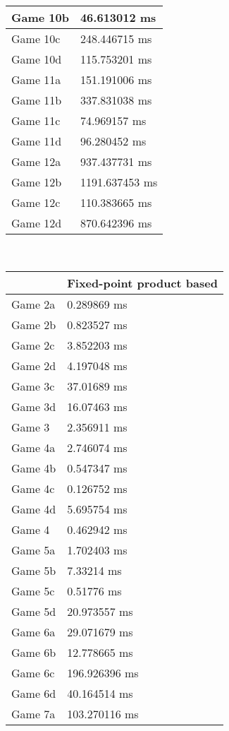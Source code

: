 \begin{multicols}{2}
\begin{tabular}{|l|l|}
	Game 10b & 46.613012 ms \\ \hline
	Game 10c & 248.446715 ms \\ \hline
	Game 10d & 115.753201 ms \\ \hline
	Game 11a & 151.191006 ms \\ \hline
	Game 11b & 337.831038 ms \\ \hline
	Game 11c & 74.969157 ms \\ \hline
	Game 11d & 96.280452 ms \\ \hline
	Game 12a & 937.437731 ms \\ \hline
	Game 12b & 1191.637453 ms \\ \hline
	Game 12c & 110.383665 ms \\ \hline
	Game 12d & 870.642396 ms \\ \hline
\end{tabular}\\
\begin{tabular}{|l|l|}
	\hline
	& Fixed-point product based \\ \hline
	Game 2a & 0.289869 ms \\ \hline
	Game 2b & 0.823527 ms \\ \hline
	Game 2c & 3.852203 ms \\ \hline
	Game 2d & 4.197048 ms \\ \hline
	Game 3c & 37.01689 ms \\ \hline
	Game 3d & 16.07463 ms \\ \hline
	Game 3 & 2.356911 ms \\ \hline
	Game 4a & 2.746074 ms \\ \hline
	Game 4b & 0.547347 ms \\ \hline
	Game 4c & 0.126752 ms \\ \hline
	Game 4d & 5.695754 ms \\ \hline
	Game 4 & 0.462942 ms \\ \hline
	Game 5a & 1.702403 ms \\ \hline
	Game 5b & 7.33214 ms \\ \hline
	Game 5c & 0.51776 ms \\ \hline
	Game 5d & 20.973557 ms \\ \hline
	Game 6a & 29.071679 ms \\ \hline
	Game 6b & 12.778665 ms \\ \hline
	Game 6c & 196.926396 ms \\ \hline
	Game 6d & 40.164514 ms \\ \hline
	Game 7a & 103.270116 ms \\ \hline

\end{tabular}
\end{multicols}
